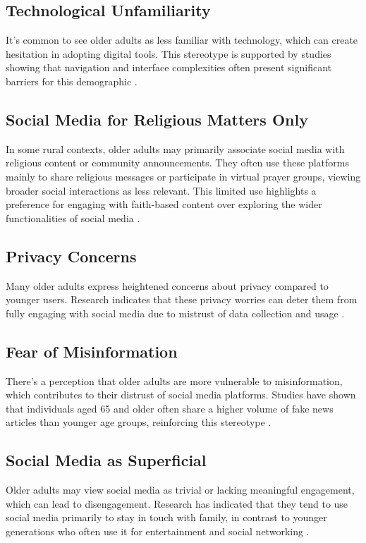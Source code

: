 \documentclass[a4paper,12pt]{article}
\begin{document}
\subsection{Technological Unfamiliarity}
It's common to see older adults as less familiar with technology, which can create hesitation in adopting digital tools. This stereotype is supported by studies showing that navigation and interface complexities often present significant barriers for this demographic \cite{Neves2019}.

\subsection{Social Media for Religious Matters Only}
In some rural contexts, older adults may primarily associate social media with religious content or community announcements. They often use these platforms mainly to share religious messages or participate in virtual prayer groups, viewing broader social interactions as less relevant. This limited use highlights a preference for engaging with faith-based content over exploring the wider functionalities of social media \cite{Campbell2021, Yadlapalli2020}.

\subsection{Privacy Concerns}
Many older adults express heightened concerns about privacy compared to younger users. Research indicates that these privacy worries can deter them from fully engaging with social media due to mistrust of data collection and usage \cite{Hargittai2017}.

\subsection{Fear of Misinformation}
There's a perception that older adults are more vulnerable to misinformation, which contributes to their distrust of social media platforms. Studies have shown that individuals aged 65 and older often share a higher volume of fake news articles than younger age groups, reinforcing this stereotype \cite{Guess2019}.

\subsection{Social Media as Superficial}
Older adults may view social media as trivial or lacking meaningful engagement, which can lead to disengagement. Research has indicated that they tend to use social media primarily to stay in touch with family, in contrast to younger generations who often use it for entertainment and social networking \cite{Anderson2020}.
\end{document}
